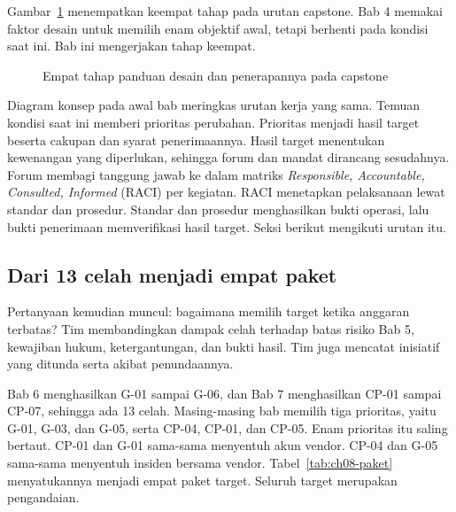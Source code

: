 Gambar~\ref{fig:ch08-desain} menempatkan keempat tahap pada urutan capstone. Bab 4 memakai
faktor desain untuk memilih enam objektif awal, tetapi berhenti pada kondisi saat ini. Bab ini
mengerjakan tahap keempat.

\begin{figure}[!htb]
  \centering
  
  \caption{Empat tahap panduan desain dan penerapannya pada capstone}
  \label{fig:ch08-desain}
\end{figure}

Diagram konsep pada awal bab meringkas urutan kerja yang sama. Temuan kondisi saat ini memberi
prioritas perubahan. Prioritas menjadi hasil target beserta cakupan dan syarat penerimaannya.
Hasil target menentukan kewenangan yang diperlukan, sehingga forum dan mandat dirancang
sesudahnya. Forum membagi tanggung jawab ke dalam matriks \textit{Responsible, Accountable,
Consulted, Informed} (RACI) per kegiatan. RACI menetapkan pelaksanaan lewat standar dan
prosedur. Standar dan prosedur menghasilkan bukti operasi, lalu bukti penerimaan memverifikasi
hasil target. Seksi berikut mengikuti urutan itu.

\subsection*{Dari 13 celah menjadi empat paket}

Pertanyaan kemudian muncul: bagaimana memilih target ketika anggaran terbatas? Tim membandingkan
dampak celah terhadap batas risiko Bab 5, kewajiban hukum, ketergantungan, dan bukti hasil. Tim
juga mencatat inisiatif yang ditunda serta akibat penundaannya.

Bab 6 menghasilkan G-01 sampai G-06, dan Bab 7 menghasilkan CP-01 sampai CP-07, sehingga ada 13
celah. Masing-masing bab memilih tiga prioritas, yaitu G-01, G-03, dan G-05, serta CP-04, CP-01,
dan CP-05. Enam prioritas itu saling bertaut. CP-01 dan G-01 sama-sama menyentuh akun vendor.
CP-04 dan G-05 sama-sama menyentuh insiden bersama vendor. Tabel~\ref{tab:ch08-paket}
menyatukannya menjadi empat paket target. Seluruh target merupakan pengandaian.

